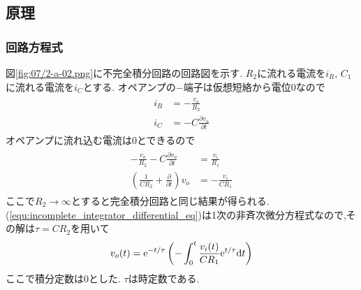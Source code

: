 \subsection{原理}
\label{subsec:incomplete_integrator_theo}
\subsubsection{回路方程式}
図\ref{fig:07/2-a-02.png}に不完全積分回路の回路図を示す.
$R_2$に流れる電流を$i_R$, $C_1$に流れる電流を$i_C$とする.
オペアンプの$-$端子は仮想短絡から電位0なので
\begin{align}
  \begin{split}
    i_R&=-\frac{v_o}{R_2}\\
    i_C&=-C\frac{\partial v_o}{\partial t}
  \end{split}
\end{align}
オペアンプに流れ込む電流は0とできるので
\begin{align}
  \begin{split}
    \label{equ:incomplete_integrator_differential_eq}
    -\frac{v_o}{R_2}-C\frac{\partial v_o}{\partial t}&=\frac{v_i}{R_1}\\
    \left(\frac{1}{CR_2}+\frac{\partial}{\partial t}\right)v_o&=-\frac{v_i}{CR_1}
  \end{split}
\end{align}
ここで$R_2\rightarrow\infty$とすると完全積分回路と同じ結果が得られる.
(\ref{equ:incomplete_integrator_differential_eq})は1次の非斉次微分方程式なので,その解は$\tau=CR_2$を用いて
\begin{align}
  \label{equ:incomplete_integrator_vo}
  v_o(t)={\rm e}^{-t/\tau}\left(-\int^t_0\frac{v_i(t)}{CR_1}{\rm e}^{t/\tau}{\rm d}t\right)
\end{align}
ここで積分定数は0とした.
$\tau$は時定数である.
